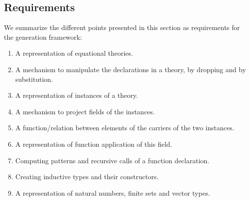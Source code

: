 \subsection{Requirements}
\label{sec:gen:reqs:summary}
We summarize the different points presented in this section as requirements for the generation framework: 
\begin{enumerate}
\item A representation of equational theories.  
\item A mechanism to manipulate the declarations in a theory, by dropping and by substitution. 
\item A representation of instances of a theory. 
\item A mechanism to project fields of the instances. 
\item A function/relation between elements of the carriers of the two instances. 
\item A representation of function application of this field.  
\item Computing patterns and recursive calls of a function declaration. 
\item Creating inductive types and their constructors. 
\item A representation of natural numbers, finite sets and vector types.    
\end{enumerate}

  




